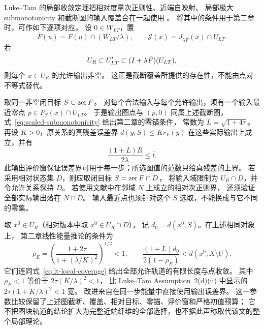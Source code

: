 \begin{remark}[局部收敛结论中的对象对应]
\label{rem:LT-coverage-map}
Luke--Tam 的局部收敛定理把相对度量次正则性、近端自映射、
局部极大 submonotonicity 和截断图的输入覆盖合在一起使用
\cite[Assumption~2, Theorem~2]{LukeTam2025GeneralizedMonotonicity}。
将其中的条件用于第二章时，可作如下逐项对应。
设 $0\in W_{LT}$，置
\[
 \bar F(u)=F(u)\cap(W_{LT}/\lambda),\qquad
 \mathcal J(x)=J_{\lambda\bar F}(x)\cap U_{LT}.
\]
若
\begin{equation}
 U_R\subset U'_{LT}\subset(I+\lambda\bar F)(U_{LT}),
 \label{eq:lt-local-coverage}
\end{equation}
则每个 $x\in U_R$ 的允许输出非空。
这正是截断覆盖所提供的存在性，不能由点对不等式替代。

取同一非空闭目标 $S\subset\operatorname{zer} F$。
对每个合法输入与每个允许输出，须有一个输入最近零点
$p\in P_S(x)\cap U_{LT}$。
于是输出图点与 $(p,0)$ 同属上述截断图，
式~\eqref{eq:scaled-submonotonicity} 给出第二章的零锚条件，
常数为 $L=\sqrt{1+4\tau}$。
再设 $K>0$，原关系的真残差误差界 $d(y,S)\le K r_F(y)$
在这些实际输出上成立，并有
\[
 \frac{(1+L)R}{2\lambda}\le\bar t.
\]
此输出评价窗保证误差界可用于每一步；所选图值的范数只给真残差的上界。
若采用相对状态集 $D$，则应取闭目标 $S=\operatorname{zer} F\cap D$，
将输入域限制为 $U_R\cap D$，并令允许关系保持 $D$。
若使用文献中在邻域 $N$ 上成立的相对次正则界，
还须验证全部实际输出落在 $N\cap D$。
输入最近点也须针对这个 $S$ 选取，不能换成与它不同的零集。

取 $x^0\in U_R$（相对版本中取 $x^0\in U_R\cap D$），
记 $d_0=d(x^0,S)$。在上述相同对象上，
第二章线性能量推论的条件为
\begin{equation}
 \rho_E=\left(\frac{1+2\tau}{1+(\lambda/K)^2}\right)^{1/2}<1,
 \qquad
 \frac{(1+L)d_0}{2(1-\rho_E)}<d(x^0,X\setminus U).
 \label{eq:lt-energy-local-budget}
\end{equation}
它们连同式~\eqref{eq:lt-local-coverage} 给出全部允许轨道的有限长度与点收敛。
其中 $\rho_E<1$ 等价于 $2\tau(K/\lambda)^2<1$，
比 Luke--Tam Assumption~2(d)(ii) 中显示的
$2\tau(1+K/\lambda)^2<1$ 宽。
改进来自在同一步能量中直接使用输出误差界。
这一参数比较保留了上述图截断、覆盖、相对目标、零锚、评价窗和严格初值预算；
它不把图块轨道的结论扩大为完整近端纤维的全部选择，也不据此声称取代该文的整个局部理论。
\end{remark}
